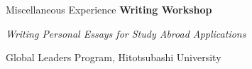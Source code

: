 \begin{rubric}{Miscellaneous Experience}
\entry*[2024/07] \textbf{Writing Workshop}\par
\emph{Writing Personal Essays for Study Abroad Applications}\par
Global Leaders Program, Hitotsubashi University
\end{rubric}
